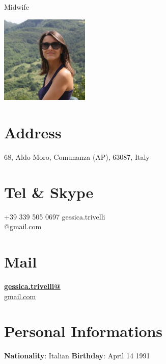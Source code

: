 \documentclass[]{friggeri-cv}
\begin{document}
      {Midwife}
      

\begin{aside}
  \includegraphics[width=4.2cm, keepaspectratio]{img/gessica_crop.jpg}
  ~
  ~
	\section{Address}
	68, Aldo Moro,
	Comunanza (AP), 63087, Italy
    ~
	\section{Tel \& Skype}
    +39 339 505 0697 \vspace{3pt}
    gessica.trivelli\\@gmail.com
    ~
	\section{Mail}
    \href{mailto:gessica.trivelli@gmail.com}{\textbf{gessica.trivelli@}\\gmail.com}
    ~
    \section{Personal Informations}
	\textbf{Nationality}: Italian
	\textbf{Birthday}: April 14 1991
	~
\end{aside}
\vspace{2.65cm}
\end{document}
